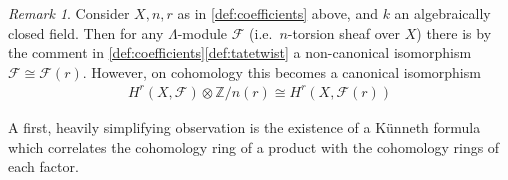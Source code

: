 \documentclass[english,headsepline=0.25pt]{scrartcl}
\theoremstyle{definition}
\theoremstyle{remark}
\newtheorem{Rem}[Def]{Remark}
\newcommand*{\Z}{\mathds{Z}}
\newcommand*{\Zmod}[1]{\Z/#1} %
\newcommand*{\F}{\mathcal{F}} %
\newcommand*{\idest}{i.e.\ }
\begin{document}
\begin{Rem}\label{cohomologyoftwists}
  Consider $X,n,r$ as in \ref{def:coefficients} above, and $k$ an
  algebraically closed field. Then for any $\Lambda$-module $\F$
  (\idest $n$-torsion sheaf over $X$) there is by the comment in
  \ref{def:coefficients}\ref{def:tatetwist} a non-canonical
  isomorphism $\F\cong\F(r)$. However, on cohomology this becomes a
  canonical isomorphism
  \cite[see][p.\,66 and p.\,163]{milnebook}
  \begin{gather*}
    H^r(X,\F)\otimes \Zmod{n}(r) \cong H^r(X,\F(r))
  \end{gather*}
\end{Rem}


A first, heavily simplifying observation is the existence of a Künneth
formula which correlates the cohomology ring of a product with the
cohomology rings of each factor.
\end{document}
